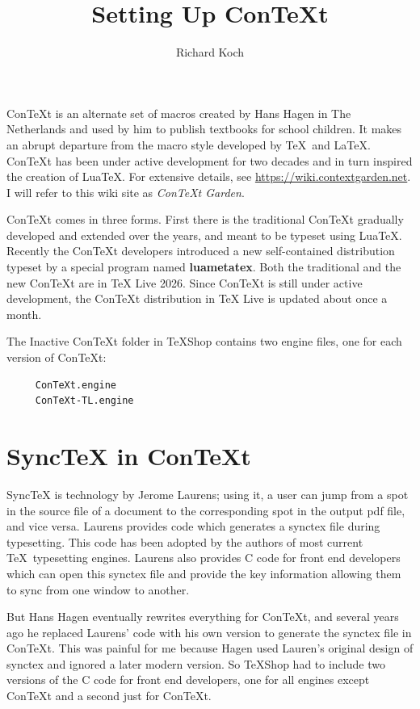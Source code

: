 \documentclass[11pt, oneside]{amsart}   	%
\title{Setting Up ConTeXt}
\author{Richard Koch}
\begin{document}
\maketitle

ConTeXt is an alternate set of macros created by Hans Hagen in The Netherlands and used by him to publish textbooks for school children.  It makes an abrupt departure from the macro style developed by \TeX\ and \LaTeX. ConTeXt has been under active development for two decades and in turn inspired the creation of LuaTeX. For extensive details, see \url{https://wiki.contextgarden.net}. I will refer to this wiki site as {\em ConTeXt Garden}.

ConTeXt comes in three forms. First there is the traditional ConTeXt gradually developed and extended over the years, and meant to be typeset using LuaTeX. Recently the ConTeXt developers introduced a new self-contained distribution typeset by a special program named {\bf luametatex}.  Both the traditional and the new ConTeXt are in TeX Live 2026. Since ConTeXt is still under active development, the ConTeXt 
distribution in TeX Live is updated about once a month.

The Inactive ConTeXt folder in TeXShop contains two engine files, one for each version of ConTeXt:
\begin{verbatim}
     ConTeXt.engine
     ConTeXt-TL.engine
\end{verbatim}


\section{SyncTeX in ConTeXt}

SyncTeX is technology by Jerome Laurens; using it, a user can jump from a spot in the source file of a document to the corresponding spot in the output pdf file, and vice versa. Laurens provides code which generates a synctex file during typesetting. This code has been adopted by the authors of most current \TeX\ typesetting engines. Laurens also provides C code for front end developers which can open this synctex file and provide the key information allowing them to sync from one window to another.

But Hans Hagen eventually rewrites everything for ConTeXt, and several years ago he replaced Laurens' code with his own version to generate the synctex file in ConTeXt. This was painful for me because Hagen used Lauren's original design of synctex and ignored a later modern version. So TeXShop had to include two versions of the C code for front end developers, one for all engines except ConTeXt and a second just for ConTeXt. 
\end{document}
